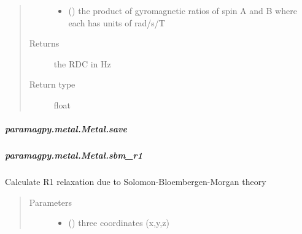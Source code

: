 \documentclass[a4paper,10pt,english,openany,oneside]{sphinxmanual}
\begin{document}
\begin{fulllineitems}
\begin{fulllineitems}
\begin{fulllineitems}
\begin{quote}
\begin{description}
\begin{itemize}
\item {} 
 () \textendash{} the product of gyromagnetic ratios of spin A and B
where each has units of rad/s/T

\end{itemize}

\item[{Returns}] \leavevmode
{} \textendash{} the RDC in Hz

\item[{Return type}] \leavevmode
float

\end{description}\end{quote}

\end{fulllineitems}



\subparagraph{paramagpy.metal.Metal.save}
\label{\detokenize{reference/generated/paramagpy.metal.Metal.save:paramagpy-metal-metal-save}}\label{\detokenize{reference/generated/paramagpy.metal.Metal.save::doc}}

\begin{fulllineitems}
\label{\detokenize{reference/generated/paramagpy.metal.Metal.save:paramagpy.metal.Metal.save}}
\end{fulllineitems}



\subparagraph{paramagpy.metal.Metal.sbm\_r1}
\label{\detokenize{reference/generated/paramagpy.metal.Metal.sbm_r1:paramagpy-metal-metal-sbm-r1}}\label{\detokenize{reference/generated/paramagpy.metal.Metal.sbm_r1::doc}}

\begin{fulllineitems}
\label{\detokenize{reference/generated/paramagpy.metal.Metal.sbm_r1:paramagpy.metal.Metal.sbm_r1}}
Calculate R1 relaxation due to Solomon-Bloembergen-Morgan theory
\begin{quote}\begin{description}
\item[{Parameters}] \leavevmode\begin{itemize}
\item {} 
 () \textendash{} three coordinates (x,y,z)


\end{itemize}
\end{description}
\end{quote}
\end{fulllineitems}
\end{fulllineitems}
\end{fulllineitems}
\end{document}

